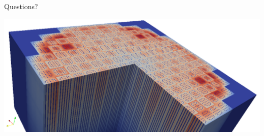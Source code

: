 \documentclass[serif]{beamer}
\begin{document}

\begin{frame}{Questions?}

  \centering
  \includegraphics[width=\linewidth]{src/3dcore.png}
      
\end{frame}



\end{document}
